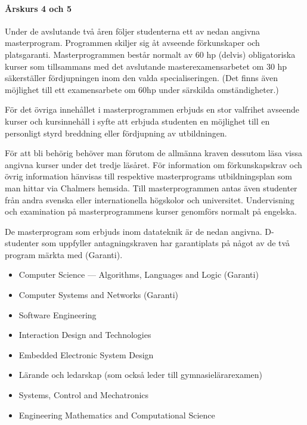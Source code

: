 \documentclass[twocolumn]{article}
\begin{document}
\paragraph{Årskurs 4 och 5}

Under de avslutande två åren följer studenterna ett av nedan angivna
masterprogram.  Programmen skiljer sig åt avseende förkunskaper och
platsgaranti.  Masterprogrammen består normalt av 60 hp (delvis)
obligatoriska kurser som tillsammans med det avslutande
masterexamensarbetet om 30 hp säkerställer fördjupningen inom den
valda specialiseringen. (Det finns även möjlighet till ett
examensarbete om 60hp under särskilda omständigheter.)

För det övriga innehållet i masterprogrammen erbjuds en stor valfrihet
avseende kurser och kursinnehåll i syfte att erbjuda studenten en
möjlighet till en personligt styrd breddning eller fördjupning av
utbildningen.

För att bli behörig behöver man förutom de allmänna kraven dessutom
läsa vissa angivna kurser under det tredje läsåret. För information om
förkunskapskrav och övrig information hänvisas till respektive
masterprograms utbildningsplan som man hittar via Chalmers
hemsida. Till masterprogrammen antas även studenter från andra svenska
eller internationella högskolor och universitet.  Undervisning och
examination på masterprogrammens kurser genomförs normalt på engelska.

De masterprogram som erbjuds inom datateknik är de nedan
angivna. D-studenter som uppfyller antagningskraven har garantiplats
på något av de två program märkta med (Garanti).

\begin{itemize}
\item \foreignlanguage{british}{Computer Science --- Algorithms,
    Languages and Logic} (Garanti)
\item \foreignlanguage{british}{Computer Systems and Networks} (Garanti)
\item \foreignlanguage{british}{Software Engineering}
\item \foreignlanguage{british}{Interaction Design and Technologies}
\item \foreignlanguage{british}{Embedded Electronic System Design}
\item Lärande och ledarskap (som också leder till gymnasielärarexamen)
\item \foreignlanguage{british}{Systems, Control and Mechatronics}
\item \foreignlanguage{british}{Engineering Mathematics and Computational Science}
\end{itemize}
\end{document}
